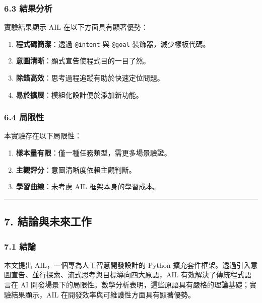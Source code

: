 \subsubsection{6.3 結果分析}\label{ux7d50ux679cux5206ux6790}

實驗結果顯示 AIL 在以下方面具有顯著優勢：

\begin{enumerate}
\def\labelenumi{\arabic{enumi}.}
\tightlist
\item
  \textbf{程式碼簡潔}：透過 \texttt{@intent} 與 \texttt{@goal}
  裝飾器，減少樣板代碼。
\item
  \textbf{意圖清晰}：顯式宣告使程式目的一目了然。
\item
  \textbf{除錯高效}：思考過程追蹤有助於快速定位問題。
\item
  \textbf{易於擴展}：模組化設計便於添加新功能。
\end{enumerate}

\subsubsection{6.4 局限性}\label{ux5c40ux9650ux6027}

本實驗存在以下局限性：

\begin{enumerate}
\def\labelenumi{\arabic{enumi}.}
\tightlist
\item
  \textbf{樣本量有限}：僅一種任務類型，需更多場景驗證。
\item
  \textbf{主觀評分}：意圖清晰度依賴主觀判斷。
\item
  \textbf{學習曲線}：未考慮 AIL 框架本身的學習成本。
\end{enumerate}

\begin{center}\rule{0.5\linewidth}{0.5pt}\end{center}

\subsection{7.
結論與未來工作}\label{ux7d50ux8ad6ux8207ux672aux4f86ux5de5ux4f5c}

\subsubsection{7.1 結論}\label{ux7d50ux8ad6}

本文提出 AIL，一個專為人工智慧開發設計的 Python
擴充套件框架。透過引入意圖宣告、並行探索、流式思考與目標導向四大原語，AIL
有效解決了傳統程式語言在 AI
開發場景下的局限性。數學分析表明，這些原語具有嚴格的理論基礎；實驗結果顯示，AIL
在開發效率與可維護性方面具有顯著優勢。

